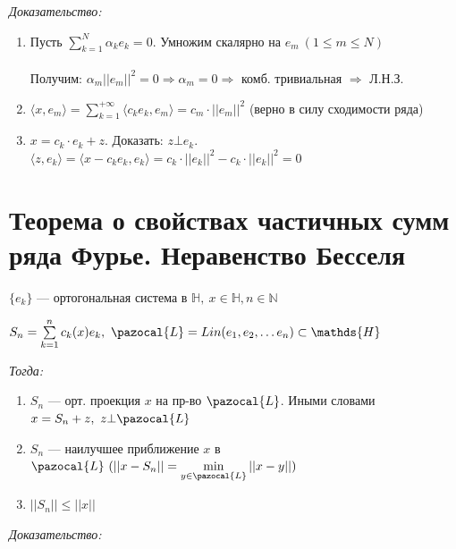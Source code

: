 \documentclass[paper=a4, fontsize=17pt]{article}
\begin{document}
\emph{Доказательство:}

\begin{enumerate}

	\item Пусть $\sum\limits_{k=1}^{N} \alpha_k e_k = 0$. Умножим скалярно на $e_m\ (1 \leqslant m \leqslant N)$\\ \\
	Получим: $\alpha_m ||e_m||^2 = 0 \Rightarrow \alpha_m = 0 \Rightarrow$ комб. тривиальная $\Rightarrow$ Л.Н.З.

	\item $\langle x, e_m \rangle = \sum\limits_{k=1}^{+\infty} \langle c_k e_k, e_m \rangle = c_m \cdot ||e_m||^2$ (верно в силу сходимости ряда)

	\item $x = c_k \cdot e_k + z$. Доказать: $z \bot e_k$.\\
	$\langle z, e_k \rangle = \langle x - c_k e_k, e_k \rangle = c_k \cdot ||e_k||^2 - c_k\cdot ||e_k||^2 = 0$

\end{enumerate}

\section{Теорема о свойствах частичных сумм ряда Фурье. Неравенство Бесселя}

$\{e_k\}$ {{---}} ортогональная система в $\mathds{H},\ x \in \mathds{H}, n \in \mathbb{N}$

$S_n = \sum\limits_{k=1}^{n} c_k(x)e_k,\ \pazocal{L} = Lin(e_1, e_2, \ldots e_n) \subset \mathds{H}$

\emph{Тогда:}

\begin{enumerate}

	\item $S_n$ {{---}} орт. проекция $x$ на пр-во $\pazocal{L}$. Иными словами $x = S_n + z,\ z \bot \pazocal{L}$

	\item $S_n$ {{---}} наилучшее приближение $x$ в $\pazocal{L}\ (||x - S_n|| = \min\limits_{y \in \pazocal{L}} ||x - y||)$

	\item $||S_n|| \leqslant ||x||$

\end{enumerate}

\emph{Доказательство:}
\end{document}
